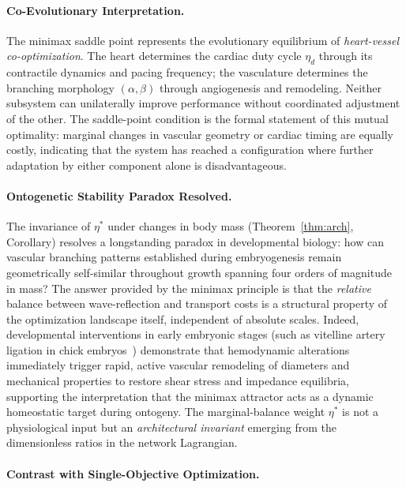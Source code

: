 \paragraph{Co-Evolutionary Interpretation.}

The minimax saddle point represents the evolutionary equilibrium of
\emph{heart-vessel co-optimization}. The heart determines the cardiac duty cycle
$\eta_d$ through its contractile dynamics and pacing frequency; the
vasculature determines the branching morphology $(\alpha, \beta)$ through
angiogenesis and remodeling. Neither subsystem can unilaterally improve
performance without coordinated adjustment of the other. The saddle-point
condition is the formal statement of this mutual optimality: marginal changes in
vascular geometry or cardiac timing are equally costly, indicating that the
system has reached a configuration where further adaptation by either component
alone is disadvantageous.

\paragraph{Ontogenetic Stability Paradox Resolved.}

The invariance of $\eta^*$ under changes in body mass (Theorem~\ref{thm:arch},
Corollary) resolves a longstanding paradox in developmental biology: how can
vascular branching patterns established during embryogenesis remain
geometrically self-similar throughout growth spanning four orders of magnitude
in mass? The answer provided by the minimax principle is that the
\emph{relative} balance between wave-reflection and transport costs is a
structural property of the optimization landscape itself, independent of
absolute scales. Indeed, developmental interventions in early embryonic stages
(such as vitelline artery ligation in chick embryos~\cite{lucitti2005})
demonstrate that hemodynamic alterations immediately trigger rapid, active
vascular remodeling of diameters and mechanical properties to restore shear
stress and impedance equilibria, supporting the interpretation that the
minimax attractor acts as a dynamic homeostatic target during ontogeny. The
marginal-balance weight $\eta^*$ is not a physiological input but an
\emph{architectural invariant} emerging from the dimensionless ratios in the
network Lagrangian.


\paragraph{Contrast with Single-Objective Optimization.}

